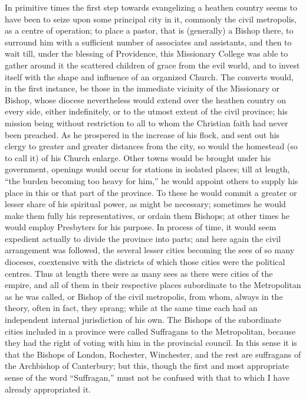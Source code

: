 In primitive times the first step towards
evangelizing a heathen country seems to have been to seize upon some
principal city in it, commonly the civil metropolis, as a centre of
operation; to place a pastor, that is (generally) a Bishop there, to
surround him with a sufficient number of associates and assistants,
and then to wait till, under the blessing of Providence, this
Missionary College was able to gather around it the scattered children
of grace from the evil world, and to invest itself with the shape and
influence of an organized Church. The converts would, in the first
instance, be those in the immediate vicinity of the Missionary or
Bishop, whose diocese nevertheless would extend over the heathen
country on every side, either indefinitely, or to the utmost extent of
the civil province; his mission being without restriction to all to
whom the Christian faith had never been preached. As he prospered in
the increase of his flock, and sent out his clergy to greater and
greater distances from the city, so would the homestead (so to call
it) of his Church enlarge. Other towns would be brought under his
government, openings would occur for stations in isolated places; till
at length, ``the burden becoming too heavy for him,'' he would appoint
others to supply his place in this or that part of the province.
To these he would commit a greater or lesser share of his spiritual
power, as might be necessary; sometimes he would make them fully his
representatives, or ordain them Bishops; at other times he would
employ Presbyters for his purpose. In process of time, it would seem
expedient actually to divide the province into parts; and here again
the civil arrangement was followed, the several lesser cities becoming
the sees of so many dioceses, coextensive with the districts of which
those cities were the political centres. Thus at length there were as
many sees as there were cities of the empire, and all of them in their
respective places subordinate to the Metropolitan as he was called, or
Bishop of the civil metropolis, from whom, always in the theory, often
in fact, they sprang; while at the same time each had an independent
internal jurisdiction of his own. The Bishops of the subordinate
cities included in a province were called Suffragans to the
Metropolitan, because they had the right of voting with him in the
provincial council. In this sense it is that the Bishops of London,
Rochester, Winchester, and the rest are suffragans of the Archbishop
of Canterbury; but this, though the first and most appropriate sense
of the word ``Suffragan,'' must not be confused with that to which I
have already appropriated it.

